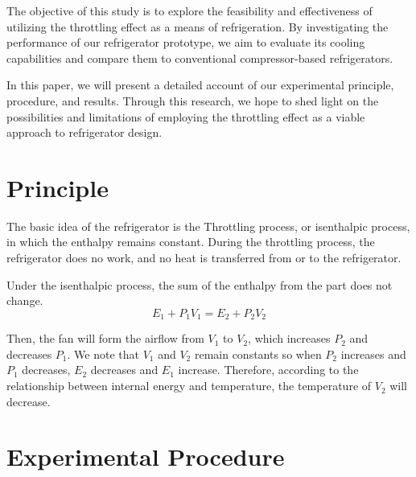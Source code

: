 \documentclass[12pt]{article}
\begin{document}
The objective of this study is to explore the feasibility and effectiveness of utilizing the throttling effect as a means of refrigeration. By investigating the performance of our refrigerator prototype, we aim to evaluate its cooling capabilities and compare them to conventional compressor-based refrigerators.

In this paper, we will present a detailed account of our experimental principle, procedure, and results. Through this research, we hope to shed light on the possibilities and limitations of employing the throttling effect as a viable approach to refrigerator design.


\section{Principle}


The basic idea of the refrigerator is the Throttling process, or isenthalpic process, in which the enthalpy remains constant. During the throttling process, the refrigerator does no work, and no heat is transferred from or to the refrigerator.

Under the isenthalpic process, the sum of the enthalpy from the part does not change.
$$
E_1 + P_1V_1=E_2+P_2V_2
$$

Then, the fan will form the airflow from $V_1$ to $V_2$, which increases $P_2$ and decreases $P_1$. We note that $V_1$ and $V_2$ remain constants so when $P_2$ increases and $P_1$ decreases, $E_2$ decreases and $E_1$ increase. Therefore, according to the relationship between internal energy and temperature, the temperature of $V_2$ will decrease.


\section{Experimental Procedure}
\end{document}
